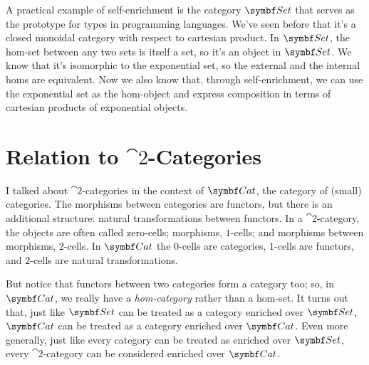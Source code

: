 A practical example of self-enrichment is the category $\Set$ that
serves as the prototype for types in programming languages. We've seen
before that it's a closed monoidal category with respect to cartesian
product. In $\Set$, the hom-set between any two sets is itself a
set, so it's an object in $\Set$. We know that it's isomorphic to
the exponential set, so the external and the internal homs are
equivalent. Now we also know that, through self-enrichment, we can use
the exponential set as the hom-object and express composition in terms
of cartesian products of exponential objects.

\section{Relation to $\cat{2}$-Categories}

I talked about $\cat{2}$-categories in the context of $\Cat$, the category
of (small) categories. The morphisms between categories are functors,
but there is an additional structure: natural transformations between
functors. In a $\cat{2}$-category, the objects are often called zero-cells;
morphisms, $1$-cells; and morphisms between morphisms, $2$-cells. In
$\Cat$ the $0$-cells are categories, $1$-cells are functors, and
$2$-cells are natural transformations.

But notice that functors between two categories form a category too; so,
in $\Cat$, we really have a \emph{hom-category} rather than a
hom-set. It turns out that, just like $\Set$ can be treated as a
category enriched over $\Set$, $\Cat$ can be treated as a
category enriched over $\Cat$. Even more generally, just like
every category can be treated as enriched over $\Set$, every
$\cat{2}$-category can be considered enriched over $\Cat$.